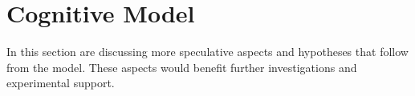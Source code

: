 \documentclass{frontiersSCNS} %
\begin{document}
%
%
%
%
%
%
%
%
%

\section{Cognitive Model}
\label{sec:cognition-neuroscience}

In this section are discussing more speculative aspects and hypotheses that follow
from the model. These aspects would benefit further investigations and
experimental support.
%

%


\end{document}
